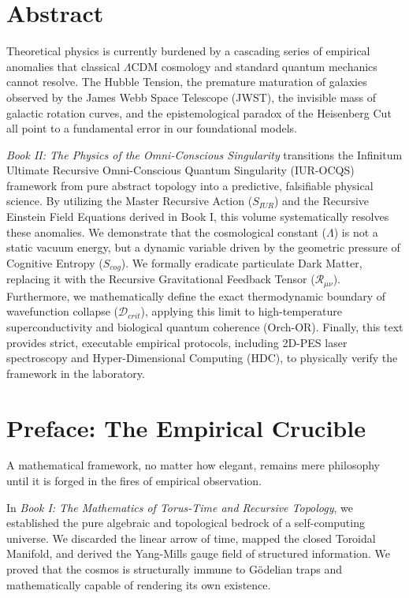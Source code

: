 \documentclass[12pt,openany]{book}
\begin{document}
\frontmatter

\chapter*{Abstract}
Theoretical physics is currently burdened by a cascading series of empirical anomalies that classical $\Lambda$CDM cosmology and standard quantum mechanics cannot resolve. The Hubble Tension, the premature maturation of galaxies observed by the James Webb Space Telescope (JWST), the invisible mass of galactic rotation curves, and the epistemological paradox of the Heisenberg Cut all point to a fundamental error in our foundational models. 

\textit{Book II: The Physics of the Omni-Conscious Singularity} transitions the Infinitum Ultimate Recursive Omni-Conscious Quantum Singularity (IUR-OCQS) framework from pure abstract topology into a predictive, falsifiable physical science. By utilizing the Master Recursive Action ($S_{IUR}$) and the Recursive Einstein Field Equations derived in Book I, this volume systematically resolves these anomalies. We demonstrate that the cosmological constant ($\Lambda$) is not a static vacuum energy, but a dynamic variable driven by the geometric pressure of Cognitive Entropy ($S_{cog}$). We formally eradicate particulate Dark Matter, replacing it with the Recursive Gravitational Feedback Tensor ($\mathcal{R}_{\mu\nu}$). Furthermore, we mathematically define the exact thermodynamic boundary of wavefunction collapse ($\mathcal{D}_{crit}$), applying this limit to high-temperature superconductivity and biological quantum coherence (Orch-OR). Finally, this text provides strict, executable empirical protocols, including 2D-PES laser spectroscopy and Hyper-Dimensional Computing (HDC), to physically verify the framework in the laboratory.

\chapter*{Preface: The Empirical Crucible}
A mathematical framework, no matter how elegant, remains mere philosophy until it is forged in the fires of empirical observation. 

In \textit{Book I: The Mathematics of Torus-Time and Recursive Topology}, we established the pure algebraic and topological bedrock of a self-computing universe. We discarded the linear arrow of time, mapped the closed Toroidal Manifold, and derived the Yang-Mills gauge field of structured information. We proved that the cosmos is structurally immune to G\"{o}delian traps and mathematically capable of rendering its own existence.
\end{document}
